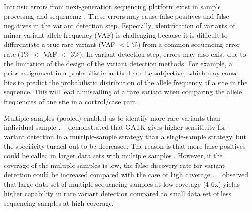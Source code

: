 \documentclass[11pt,reqno]{amsart}
\begin{document}
Intrinsic errors from next-generation sequencing platform exist in sample processing and sequencing \citep{Olson2015}.
These errors may cause false positives and false negatives in the variant detection step.
Especially, identification of variants of minor variant allele frequency (VAF) is challenging because it is difficult to differentiate a true rare variant (VAF $<$1 \%) from a common sequencing error rate (1\% $<$ VAF $<$ 3\%).
In variant detection step, errors may also exist due to the limitation of the design of the variant detection methods.
For example, a prior assignment in a probabilistic method can be subjective, which may cause bias to predict the probabilistic distribution of the allele frequency of a site in the sequence.
This will lead a miscalling of a rare variant when comparing the allele frequencies of one site in a control/case pair.

Multiple samples (pooled) enabled us to identify more rare variants than individual sample \citep{Bao2014, liu2012steps}.
~\citet{liu2013variant} demonstrated that GATK gives higher sensitivity for variant detection in a multiple-sample strategy than a single-sample strategy, but the specificity turned out to be decreased.
The reason is that more false positives could be called in larger data sets with multiple samples \citep{Nielsen2011}. 
However, if the coverage of the multiple samples is low, the false discovery rate for variant detection could be increased compared with the case of high coverage \citep{Cheng2014}.
~\citet{le2011snp} observed that large data set of multiple sequencing samples at low coverage (4-6x) yields higher capability in rare variant detection compared to small data set of less sequencing samples at high coverage.
\end{document}
